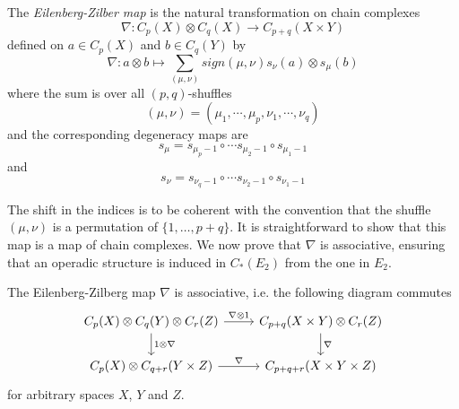 \documentclass[TFM.tex]{subfiles}
\begin{document}
\begin{defi}
The \emph{Eilenberg-Zilber map} is the natural transformation on chain complexes
\[
\nabla :  C_p(X) \otimes C_q(X) \to C_{p+q}(X \times Y)
\]
defined on $a\in C_p(X)$ and $b\in C_q(Y)$ by 
\[
\nabla : a \otimes b \mapsto 
   \sum_{(\mu,\nu)} sign(\mu,\nu) s_\nu(a) \otimes s_\mu(b)
\]
where the sum is over all $(p,q)$-shuffles
\[
(\mu,\nu) = (\mu_1, \cdots, \mu_p, \nu_1, \cdots, \nu_q)
\]
and the corresponding degeneracy maps are
\[
s_{\mu} = s_{\mu_p - 1} \circ \cdots s_{\mu_2 - 1} \circ s_{\mu_1 - 1}
\]
and
\[
s_{\nu} = s_{\nu_q - 1} \circ \cdots s_{\nu_2 - 1} \circ s_{\nu_1 - 1}
\]
\end{defi}
The shift in the indices is to be coherent with the convention that the shuffle $(μ,ν)$ is a permutation of $\{1,\dots,p+q\}$. It is straightforward to show that this map is a map of chain complexes. We now prove that $\nabla$ is associative, ensuring that an operadic structure is induced in $C_*(E_2)$ from the one in $E_2$. 

\begin{lemma}
The Eilenberg-Zilberg map $\nabla$ is associative, i.e. the following diagram commutes
\[
\begin{tikzcd}
C_p(X)\otimes C_q(Y)\otimes C_r(Z)\arrow[r, "\nabla\otimes 1"]\arrow[d, "1\otimes\nabla"] & C_{p+q}(X\times Y)\otimes C_r(Z)\arrow[d,"\nabla"]\\
C_p(X)\otimes C_{q+r}(Y\times Z)\arrow[r, "\nabla"] & C_{p+q+r}(X\times Y\times Z)
\end{tikzcd}
\]
for arbitrary spaces $X$, $Y$ and $Z$. 
\end{lemma} 
\end{document}
